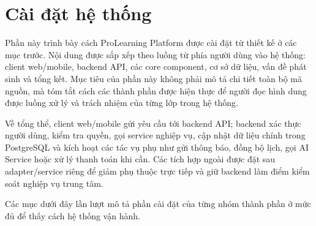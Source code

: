 \section{Cài đặt hệ thống}
\label{sec:system-implementation}
\begingroup
\sloppy

Phần này trình bày cách ProLearning Platform được cài đặt từ thiết kế ở các mục trước. Nội dung được sắp xếp theo luồng từ phía người dùng vào hệ thống: client web/mobile, backend API, các core component, cơ sở dữ liệu, vấn đề phát sinh và tổng kết. Mục tiêu của phần này không phải mô tả chi tiết toàn bộ mã nguồn, mà tóm tắt cách các thành phần được hiện thực để người đọc hình dung được luồng xử lý và trách nhiệm của từng lớp trong hệ thống.

Về tổng thể, client web/mobile gửi yêu cầu tới backend API; backend xác thực người dùng, kiểm tra quyền, gọi service nghiệp vụ, cập nhật dữ liệu chính trong PostgreSQL và kích hoạt các tác vụ phụ như gửi thông báo, đồng bộ lịch, gọi AI Service hoặc xử lý thanh toán khi cần. Các tích hợp ngoài được đặt sau adapter/service riêng để giảm phụ thuộc trực tiếp và giữ backend làm điểm kiểm soát nghiệp vụ trung tâm.

\begin{center}
\small
{}
\end{center}

Các mục dưới đây lần lượt mô tả phần cài đặt của từng nhóm thành phần ở mức đủ để thấy cách hệ thống vận hành.


% 






\endgroup
